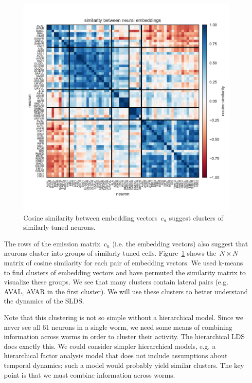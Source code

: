 \documentclass{article}
\begin{document}
\begin{figure}[h]
\centering%
\includegraphics[width=5.5in]{figures/lds/permuted_similarity}
\vspace{-3em}
\caption{Cosine similarity between embedding vectors~$c_n$
  suggest clusters of similarly tuned neurons. }
\label{fig:clusters}
\end{figure}

The rows of the emission matrix~$c_n$ (i.e. the embedding vectors)
also suggest that neurons cluster into groups of similarly tuned
cells.  Figure~\ref{fig:clusters} shows the~${N \times N}$ matrix of
cosine similarity for each pair of embedding vectors.  We used k-means
to find clusters of embedding vectors and have permuted the
similarity matrix to visualize these groups.  We see that many
clusters contain lateral pairs (e.g. {\sf AVAL, AVAR} in
the first cluster). 
We will use these clusters to better understand the dynamics of
the SLDS.

Note that this clustering is not so simple without a hierarchical model.
Since we never see all 61 neurons in a single worm, we need some means
of combining information across worms in order to cluster their activity.
The hierarchical LDS does exactly this.  We could consider simpler
hierarchical models, e.g. a hierarchical factor analysis model that does
not include assumptions about temporal dynamics; such a model would
probably yield similar clusters.  The key point is that we must combine
information across worms.
\end{document}

